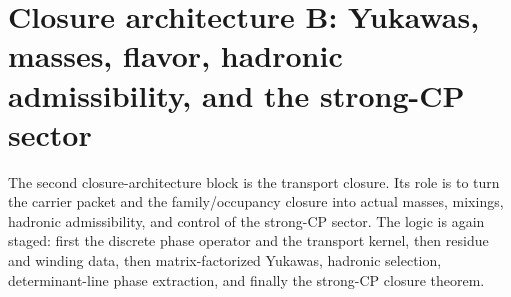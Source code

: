 \section{Closure architecture B: Yukawas, masses, flavor, hadronic admissibility, and the strong-CP sector}

The second closure-architecture block is the transport closure. Its role is to turn the carrier
packet and the family/occupancy closure into actual masses, mixings, hadronic admissibility, and
control of the strong-CP sector. The logic is again staged: first the discrete phase operator and
the transport kernel, then residue and winding data, then matrix-factorized Yukawas, hadronic
selection, determinant-line phase extraction, and finally the strong-CP closure theorem.

